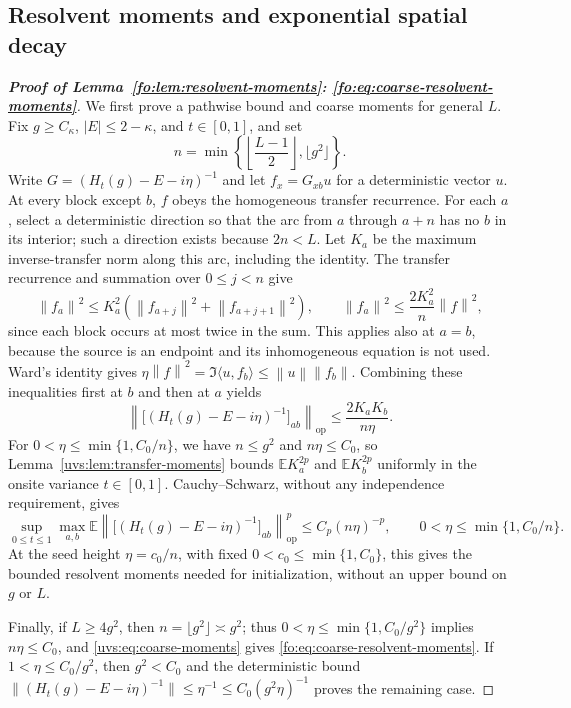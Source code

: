 \documentclass[11pt]{article}
\numberwithin{equation}{section}
\theoremstyle{remark}
\newcommand{\E}{\mathbb E}
\newcommand{\op}{\mathrm{op}}
\newcommand{\norm}[1]{\left\|#1\right\|}
\begin{document}
\subsection{Resolvent moments and exponential spatial decay}
\label{sec:uniform-resolvent-seed}
\begin{proof}[\textbf{Proof of Lemma~\ref{fo:lem:resolvent-moments}: \eqref{fo:eq:coarse-resolvent-moments}}]
We first prove a pathwise bound and coarse moments for general $L$.
Fix $g\ge C_\kappa$, $|E|\le2-\kappa$, and $t\in[0,1]$, and set
\begin{equation}\label{uvs:eq:window-length}
 n=\min\!\left\{\left\lfloor\frac{L-1}{2}\right\rfloor,
                    \lfloor g^2\rfloor\right\}.
\end{equation}
Write $G=(H_t(g)-E-i\eta)^{-1}$ and let $f_x=G_{xb}u$ for a
deterministic vector $u$. At every block except $b$, $f$ obeys the
homogeneous transfer recurrence. For each $a$, select a deterministic
direction so that the arc from $a$ through $a+n$ has no $b$ in its
interior; such a direction exists because $2n<L$.
Let $K_a$ be the maximum inverse-transfer norm along this arc,
including the identity. The transfer recurrence and summation over
$0\le j<n$ give
\[
 \norm{f_a}^2
 \le K_a^2(\norm{f_{a+j}}^2+\norm{f_{a+j+1}}^2),\qquad
 \norm{f_a}^2\le\frac{2K_a^2}{n}\norm f^2,
\]
since each block occurs at most twice in the sum. This applies also at
$a=b$, because the source is an endpoint and its inhomogeneous equation
is not used. Ward's identity gives
$\eta\norm f^2=\Im\langle u,f_b\rangle\le\norm u\norm{f_b}$.
Combining these inequalities first at $b$ and then at $a$ yields
\begin{equation}\label{uvs:eq:pathwise-green-block}
 \norm{\bigl[(H_t(g)-E-i\eta)^{-1}\bigr]_{ab}}_{\op}
 \le\frac{2K_aK_b}{n\eta}.
\end{equation}
For $0<\eta\le\min\{1,C_0/n\}$, we have $n\le g^2$ and
$n\eta\le C_0$, so Lemma~\ref{uvs:lem:transfer-moments} bounds
$\E K_a^{2p}$ and $\E K_b^{2p}$ uniformly in the onsite variance
$t\in[0,1]$. Cauchy--Schwarz, without any independence requirement, gives
\begin{equation}\label{uvs:eq:coarse-moments}
 \sup_{0\le t\le1}\max_{a,b}
 \E\norm{\bigl[(H_t(g)-E-i\eta)^{-1}\bigr]_{ab}}_{\op}^p
 \le C_p(n\eta)^{-p},\qquad 0<\eta\le\min\{1,C_0/n\}.
\end{equation}
At the seed height $\eta=c_0/n$, with fixed
$0<c_0\le\min\{1,C_0\}$, this gives the bounded resolvent moments
needed for initialization, without an upper bound on $g$ or $L$.

Finally, if $L\ge4g^2$, then $n=\lfloor g^2\rfloor\asymp g^2$;
thus $0<\eta\le\min\{1,C_0/g^2\}$ implies $n\eta\le C_0$, and
\eqref{uvs:eq:coarse-moments} gives
\eqref{fo:eq:coarse-resolvent-moments}.
If $1<\eta\le C_0/g^2$, then $g^2<C_0$ and the deterministic bound
$\|(H_t(g)-E-i\eta)^{-1}\|\le\eta^{-1}\le C_0(g^2\eta)^{-1}$
proves the remaining case.
\end{proof}
\end{document}
